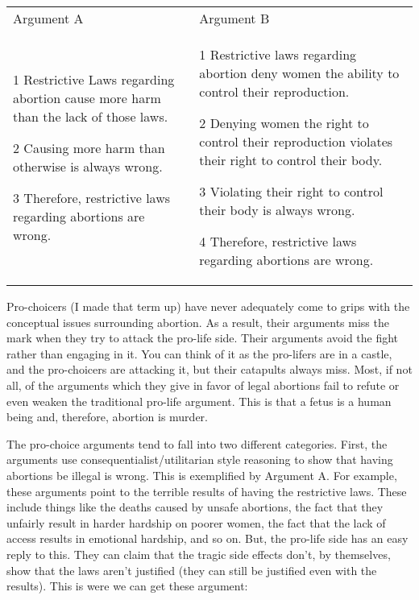 \noindent
\begin{tabular}{p{2.75in}|p{2.75in}}
Argument A&Argument B\\
    \begin{earg}
    \item[1] Restrictive Laws regarding abortion cause more harm than the lack of those laws.
    \item[2] Causing more harm than otherwise is always wrong.
    \item[3] Therefore, restrictive laws regarding abortions are wrong.
\end{earg}&\begin{earg}
    \item[1] Restrictive laws regarding abortion deny women the ability to control their reproduction.
    \item[2] Denying women the right to control their reproduction violates their right to control their body.
    \item[3] Violating their right to control their body is always wrong.
    \item[4] Therefore, restrictive laws regarding abortions are wrong.
\end{earg}\\
\end{tabular}
Pro-choicers (I made that term up) have never adequately come to grips with the conceptual issues surrounding abortion. As a result, their arguments miss the mark when they try to attack the pro-life side. Their arguments avoid the fight rather than engaging in it. You can think of it as the pro-lifers are in a castle, and the pro-choicers are attacking it, but their catapults always miss.  Most, if not all, of the arguments which they give in favor of legal abortions fail to refute or even weaken the traditional pro-life argument. This is that a fetus is a human being and, therefore, abortion is murder.

The pro-choice arguments tend to fall into two different categories. First, the arguments use consequentialist/utilitarian style reasoning to show that having abortions be illegal is wrong. This is exemplified by Argument A. For example, these arguments point to the terrible results of having the restrictive laws. These include things like the deaths caused by unsafe abortions, the fact that they unfairly result in harder hardship on poorer women, the fact that the lack of access results in emotional hardship, and so on. But, the pro-life side has an easy reply to this. They can claim that the tragic side effects don't, by themselves, show that the laws aren't justified (they can still be justified even with the results). This is were we can get these argument: 


